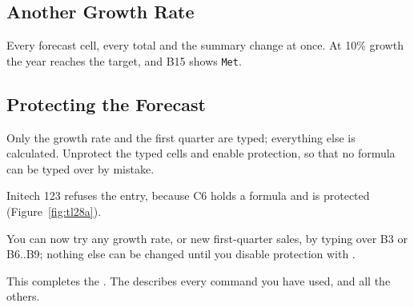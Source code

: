 \subsection{Another Growth Rate}
\begin{Keystrokes}
\end{Keystrokes}
Every forecast cell, every total and the summary change at once.  At 10\%
growth the year reaches the target, and B15 shows \texttt{Met}.

\subsection{Protecting the Forecast}
Only the growth rate and the first quarter are typed; everything else is
calculated.  Unprotect the typed cells and enable protection, so that no
formula can be typed over by mistake.

\begin{Keystrokes}
\end{Keystrokes}
Initech 123 refuses the entry, because C6 holds a formula and is protected
(Figure~\ref{fig:tl28a}).
\begin{Keystrokes}
\end{Keystrokes}

You can now try any growth rate, or new first-quarter sales, by typing
over B3 or B6..B9; nothing else can be changed until you disable
protection with .

This completes the .  The  describes every command you have used, and all the others.
